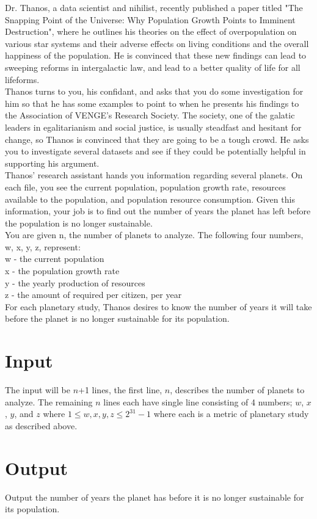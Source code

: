 
\noindent Dr. Thanos, a data scientist and nihilist, recently published a paper titled "The Snapping Point of the Universe: Why Population Growth Points to Imminent Destruction", where he outlines his theories on the effect of overpopulation on various star systems and their adverse effects on living conditions and the overall happiness of the population. He is convinced that these new findings can lead to sweeping reforms in intergalactic law, and lead to a better quality of life for all lifeforms.\\

\noindent Thanos turns to you, his confidant, and asks that you do some investigation for him so that he has some examples to point to when he presents his findings to the Association of VENGE's Research Society. The society, one of the galatic leaders in egalitarianism and social justice, is usually steadfast and hesitant for change, so Thanos is convinced that they are going to be a tough crowd. He asks you to investigate several datasets and see if they could be potentially helpful in supporting his argument.\\

\noindent Thanos' research assistant hands you information regarding several planets. On each file, you see the current population, population growth rate, resources available to the population, and population resource consumption. Given this information, your job is to find out the number of years the planet has left before the population is no longer sustainable.\\

\noindent You are given n, the number of planets to analyze. The following four numbers, w, x, y, z, represent:\\
w - the current population\\
x - the population growth rate\\
y - the yearly production of resources\\
z - the amount of required per citizen, per year\\

\noindent For each planetary study, Thanos desires to know the number of years it will take before the planet is no longer sustainable for its population.\\

\section*{Input}
The input will be $n$+1 lines, the first line, $n$, describes the number of planets to analyze.
The remaining $n$ lines each have single line consisting of 4 numbers; $w$, $x$, $y$, and $z$ where $1 \leq w, x, y, z \leq 2^{31} - 1$ where each is a metric of planetary study as described above.

\section*{Output}
Output the number of years the planet has before it is no longer sustainable for its population.
